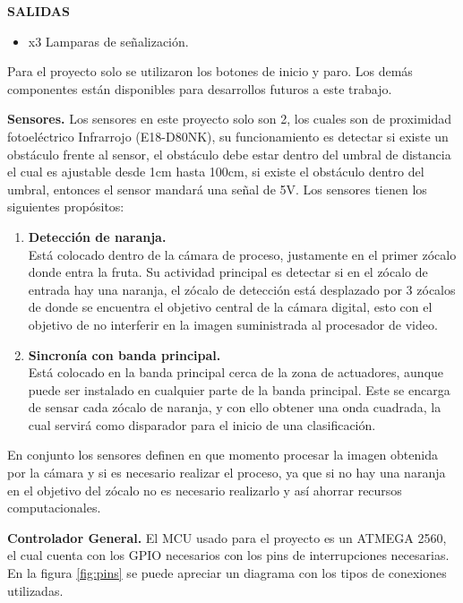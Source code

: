 \documentclass[twoside,spanish,ESP,MSc]{plantillaLabUPV}
\theoremstyle{definition}
\begin{document}
\textbf{SALIDAS}
\begin{itemize}
	\item x3 Lamparas de señalización.
\end{itemize}

Para el proyecto solo se utilizaron los botones de inicio y paro. Los demás componentes están disponibles para desarrollos futuros a este trabajo.


\checkmark\textbf{Sensores.} Los sensores en este proyecto solo son 2, los cuales son de proximidad fotoeléctrico Infrarrojo (E18-D80NK), su funcionamiento es detectar si existe un obstáculo frente al sensor, el obstáculo debe estar dentro del umbral de distancia el cual es ajustable desde 1cm hasta 100cm, si existe el obstáculo dentro del umbral, entonces el sensor mandará una señal de 5V. Los sensores tienen los siguientes propósitos:

\begin{enumerate}
	\item \textbf{Detección de naranja.}\\
	Está colocado dentro de la cámara de proceso, justamente en el primer zócalo donde entra la fruta. Su actividad principal es detectar si en el zócalo de entrada hay una naranja, el zócalo de detección está desplazado por 3 zócalos de donde se encuentra el objetivo central de la cámara digital, esto con el objetivo de no interferir en la imagen suministrada al procesador de video.
	\item \textbf{Sincronía con banda principal.}\\
	Está colocado en la banda principal cerca de la zona de actuadores, aunque puede ser instalado en cualquier parte de la banda principal. Este se encarga de sensar cada zócalo de naranja, y con ello obtener una onda cuadrada, la cual servirá como disparador para el inicio de una clasificación.
\end{enumerate} 

En conjunto los sensores definen en que momento procesar la imagen obtenida por la cámara y si es necesario realizar el proceso, ya que si no hay una naranja en el objetivo del zócalo no es necesario realizarlo y así ahorrar recursos computacionales.


\checkmark\textbf{Controlador General.} El MCU usado para el proyecto es un ATMEGA 2560, el cual cuenta con los GPIO necesarios con los pins de interrupciones necesarias. En la figura \ref{fig:pins} se puede apreciar un diagrama con los tipos de conexiones utilizadas.
\end{document}
